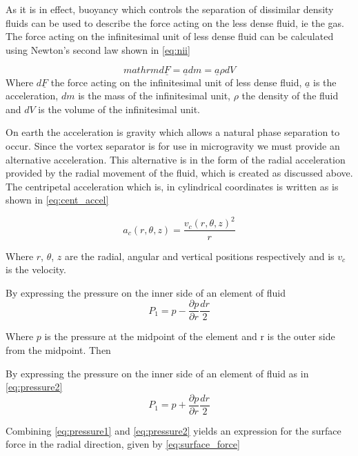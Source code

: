 \documentclass[12pt]{article}
\begin{document}
As it is in effect, buoyancy which controls the separation of dissimilar density fluids can be used to describe the force acting on the less dense fluid, ie the gas. The force acting on the infinitesimal unit of less dense fluid can be calculated using Newton’s second law shown in \cref{eq:nii}


\begin{equation}
mathrm{d\underline{F}=\underline{a}dm=\underline{a}\rho dV}
\label{eq:nii}
\end{equation}
Where $d\underline{F}$ the force acting on the infinitesimal unit of less dense fluid, $\underline{a}$ is the acceleration, $dm$ is the mass of the infinitesimal unit, $\rho$ the density of the fluid and $dV$ is the volume of the infinitesimal unit.

On earth the acceleration is gravity which allows a natural phase separation to occur. Since the vortex separator is for use in microgravity we must provide an alternative acceleration. This alternative is in the form of the radial acceleration provided by the radial movement of the fluid, which is created as discussed above.  The centripetal acceleration which is, in cylindrical coordinates is written as is shown in \cref{eq:cent_accel}

\begin{equation}
a_c(r,\theta, z)=\frac{v_c(r,\theta, z)^2}{r}
\label{eq:cent_accel}
\end{equation}

Where $r$, $\theta$, $z$ are the radial, angular and vertical positions respectively and is $v_c$ is the velocity.

By expressing the pressure on the inner side of an element of fluid
\begin{equation}
P_1=p -\frac{\partial p}{\partial r} \frac{d r}{2}
\label{eq:pressure1}
\end{equation}

Where $p$ is the pressure at the midpoint of the element and r is the outer side from the midpoint. Then 

By expressing the pressure on the inner side of an element of fluid as in \cref{eq:pressure2}
\begin{equation}
P_1=p+\frac{\partial p}{\partial r} \frac{d r}{2}
\label{eq:pressure2}
\end{equation}

Combining \cref{eq:pressure1} and \cref{eq:pressure2} yields an expression for the surface force in the radial direction, given by \cref{eq:surface_force}
\end{document}
